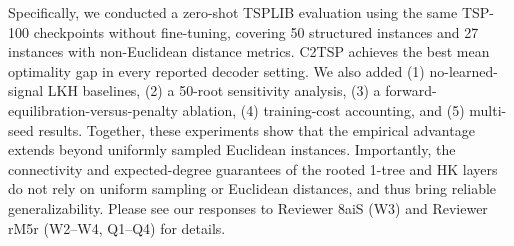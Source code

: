 \documentclass[10pt]{article}
\begin{document}
Specifically, we conducted a zero-shot TSPLIB evaluation using the same TSP-100 checkpoints without fine-tuning, covering 50 structured instances and 27 instances with non-Euclidean distance metrics. C2TSP achieves the best mean optimality gap in every reported decoder setting. We also added (1) no-learned-signal LKH baselines, (2) a 50-root sensitivity analysis, (3) a forward-equilibration-versus-penalty ablation, (4) training-cost accounting, and (5) multi-seed results. Together, these experiments show that the empirical advantage extends beyond uniformly sampled Euclidean instances. Importantly, the connectivity and expected-degree guarantees of the rooted 1-tree and HK layers do not rely on uniform sampling or Euclidean distances, and thus bring reliable generalizability. Please see our responses to Reviewer 8aiS (W3) and Reviewer rM5r (W2–W4, Q1–Q4) for details.



\clearpage


\clearpage

\end{document}
